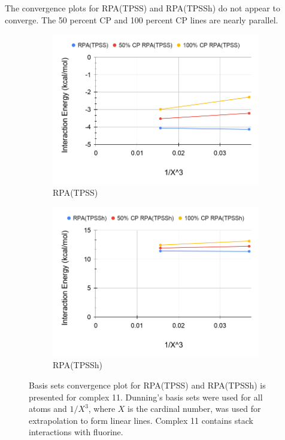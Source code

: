 \documentclass[11pt]{article}
\begin{document}
The convergence plots for RPA(TPSS) and RPA(TPSSh) do not appear to
converge. The 50 percent CP and 100 percent CP lines are nearly parallel.


\begin{figure}[H]
  \centering
  \begin{subfigure}{.5\textwidth}
    \centering
    \includegraphics[scale=0.3]{tpss-11.png}
    \caption{RPA(TPSS)}
    \label{fig:tpss11}
  \end{subfigure}%
  \begin{subfigure}{.5\textwidth}
    \centering
    \includegraphics[scale=0.3]{tpssh-11.png}
    \caption{RPA(TPSSh)}
    \label{fig:tpssh_11}
  \end{subfigure}
  \caption{Basis sets convergence plot for RPA(TPSS) and RPA(TPSSh) is
    presented for complex 11. Dunning's basis sets were used for all
    atoms and $1/X^3$, where $X$ is the cardinal number, was used for
    extrapolation to form linear lines. Complex 11 contains stack
    interactions with fluorine.}
  \label{fig:complex_11}
\end{figure}
\end{document}
